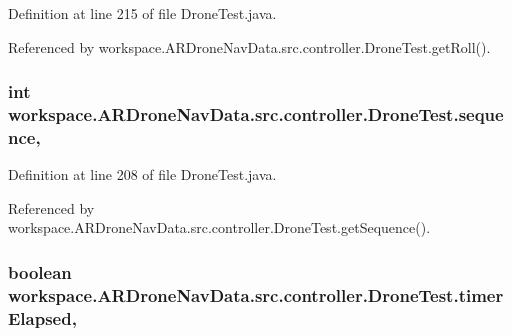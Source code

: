 Definition at line 215 of file Drone\+Test.\+java.



Referenced by workspace.\+A\+R\+Drone\+Nav\+Data.\+src.\+controller.\+Drone\+Test.\+get\+Roll().

\hypertarget{classworkspace_1_1_a_r_drone_nav_data_1_1src_1_1controller_1_1_drone_test_af2d00cb6ad7c1629ef89c5c9847a1c99}{}
\subsubsection[{sequence}]{\setlength{\rightskip}{0pt plus 5cm}int workspace.\+A\+R\+Drone\+Nav\+Data.\+src.\+controller.\+Drone\+Test.\+sequence\hspace{0.3cm}{\ttfamily [static]}, {\ttfamily [protected]}}\label{classworkspace_1_1_a_r_drone_nav_data_1_1src_1_1controller_1_1_drone_test_af2d00cb6ad7c1629ef89c5c9847a1c99}


Definition at line 208 of file Drone\+Test.\+java.



Referenced by workspace.\+A\+R\+Drone\+Nav\+Data.\+src.\+controller.\+Drone\+Test.\+get\+Sequence().

\hypertarget{classworkspace_1_1_a_r_drone_nav_data_1_1src_1_1controller_1_1_drone_test_a943e24d0384cb95025b887bf844c3445}{}
\subsubsection[{timer\+Elapsed}]{\setlength{\rightskip}{0pt plus 5cm}boolean workspace.\+A\+R\+Drone\+Nav\+Data.\+src.\+controller.\+Drone\+Test.\+timer\+Elapsed\hspace{0.3cm}{\ttfamily [static]}, {\ttfamily [protected]}}\label{classworkspace_1_1_a_r_drone_nav_data_1_1src_1_1controller_1_1_drone_test_a943e24d0384cb95025b887bf844c3445}


